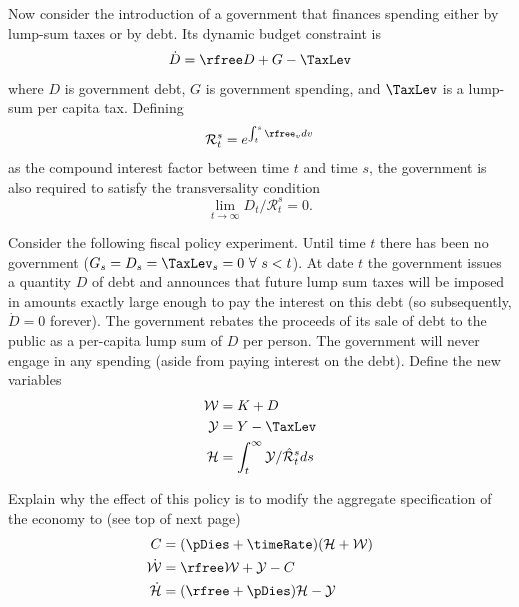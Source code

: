 Now consider the introduction of a government that finances spending
either by lump-sum taxes or by debt.  Its dynamic budget constraint is
\begin{equation}
  \dot{D} =  \rfree D + G - \TaxLev
\end{equation}
where $D$ is government debt, $G$ is government spending, and
$\TaxLev$ is a lump-sum per capita tax.  Defining
\begin{equation}\begin{gathered}\begin{aligned}
  \mathcal{R}_t^{s} = e^{\int_t^{s}\rfree_v dv}
\end{aligned}\end{gathered}\end{equation}
as the compound interest factor between time $t$ and time $s$, the
government is also required to satisfy the transversality condition
\begin{equation}
  \label{eq:10}
  \lim_{t \rightarrow \infty} D_t/\mathcal{R}_t^{s} = 0.
\end{equation}

Consider the following fiscal policy experiment.  Until time $t$ there
has been no government ($G_s = D_s = \TaxLev_s=0~\forall~s<t$).  At date
$t$ the government issues a quantity $D$ of debt and announces that
future lump sum taxes will be imposed in amounts exactly large enough
to pay the interest on this debt (so subsequently, $\dot{D}=0$
forever).  The government rebates the proceeds of its sale of debt to
the public as a per-capita lump sum of $D$ per person.  The government
will never engage in any spending (aside from paying interest on the
debt).  Define the new variables
\begin{equation}\begin{gathered}\begin{aligned}
  \mathcal{W} & =  K + D
\\ \mathcal{Y} & =  Y - \TaxLev
\\ \mathcal{H} & =  \int_{t}^{\infty} \mathcal{Y}/\hat{\mathcal{R}}_{t}^{s} ds
\end{aligned}\end{gathered}\end{equation}

\item Explain why the effect of this policy is to modify the aggregate
specification of the economy to (see top of next page) \pagebreak
\begin{equation}\begin{gathered}\begin{aligned}
   C & =  (\pDies+\timeRate) (\mathcal{H} + \mathcal{W})  \label{eq:Cnew}
\\ \dot{\mathcal{W}} & =  \rfree \mathcal{W} + \mathcal{Y}- C 
\\ \dot{\mathcal{H}} & =  (\rfree+\pDies) \mathcal{H} - \mathcal{Y}
\end{aligned}\end{gathered}\end{equation}


